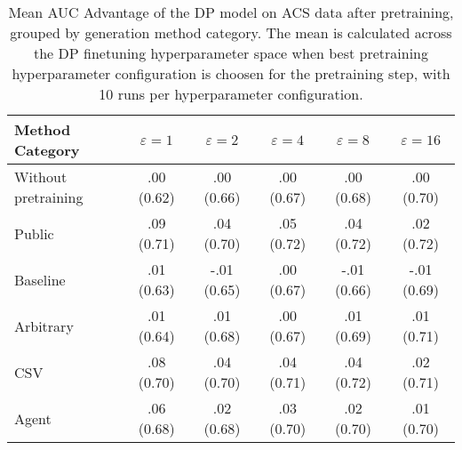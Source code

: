 \begin{table}[h!]
    \centering
    \caption{Mean AUC Advantage of the DP model on ACS data after pretraining, grouped by generation method category. The mean is calculated across the DP finetuning hyperparameter space when best pretraining hyperparameter configuration is choosen for the pretraining step, with 10 runs per hyperparameter configuration.}
    \label{tab:epsilon_comparison}
    \begin{tabular}{lccccc}
    \toprule
    Method Category & $\varepsilon=1$ & $\varepsilon=2$ & $\varepsilon=4$ & $\varepsilon=8$ & $\varepsilon=16$ \\
    \midrule
    Without pretraining & .00 {\small (0.62)} & .00 {\small (0.66)} & .00 {\small (0.67)} & .00 {\small (0.68)} & .00 {\small (0.70)} \\
    \arrayrulecolor{black!50!}\midrule
    Public & \cellcolor{gold!30}.09 {\small (0.71)} & \cellcolor{gold!30}.04 {\small (0.70)} & \cellcolor{gold!30}.05 {\small (0.72)} & \cellcolor{gold!30}.04 {\small (0.72)} & \cellcolor{gold!30}.02 {\small (0.72)} \\
    \arrayrulecolor{black!50!}\midrule
    Baseline & .01 {\small (0.63)} & -.01 {\small (0.65)} & .00 {\small (0.67)} & -.01 {\small (0.66)} & -.01 {\small (0.69)} \\
    \arrayrulecolor{black!50!}\midrule
    Arbitrary & .01 {\small (0.64)} & .01 {\small (0.68)} & .00 {\small (0.67)} & .01 {\small (0.69)} & \cellcolor{bronze!30}.01 {\small (0.71)} \\
    \arrayrulecolor{black!50!}\midrule
    CSV & \cellcolor{silver!30}.08 {\small (0.70)} & \cellcolor{silver!30}.04 {\small (0.70)} & \cellcolor{silver!30}.04 {\small (0.71)} & \cellcolor{silver!30}.04 {\small (0.72)} & \cellcolor{silver!30}.02 {\small (0.71)} \\
    Agent & \cellcolor{bronze!30}.06 {\small (0.68)} & \cellcolor{bronze!30}.02 {\small (0.68)} & \cellcolor{bronze!30}.03 {\small (0.70)} & \cellcolor{bronze!30}.02 {\small (0.70)} & .01 {\small (0.70)} \\
    \bottomrule
    \end{tabular}
\end{table}